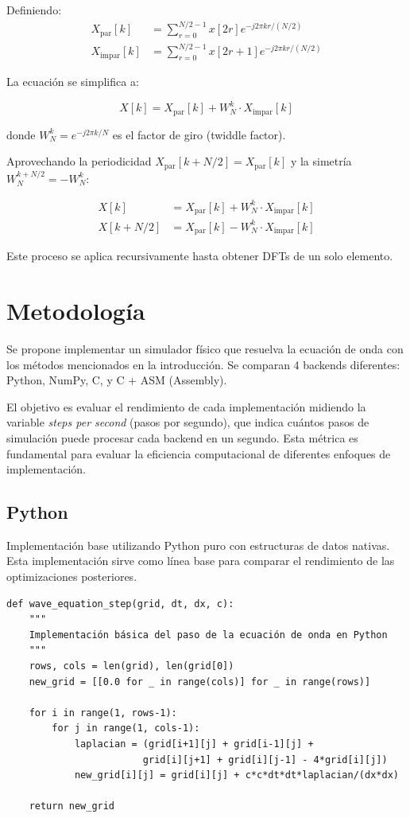 \documentclass[a4paper]{article}
\begin{document}
Definiendo:
\begin{align}
X_{\text{par}}[k] &= \sum_{r=0}^{N/2-1} x[2r] e^{-j2\pi kr/(N/2)} \\
X_{\text{impar}}[k] &= \sum_{r=0}^{N/2-1} x[2r+1] e^{-j2\pi kr/(N/2)}
\end{align}

La ecuación se simplifica a:

\begin{equation}
X[k] = X_{\text{par}}[k] + W_N^k \cdot X_{\text{impar}}[k]
\end{equation}

donde $W_N^k = e^{-j2\pi k/N}$ es el factor de giro (twiddle factor).

Aprovechando la periodicidad $X_{\text{par}}[k + N/2] = X_{\text{par}}[k]$ y la simetría $W_N^{k+N/2} = -W_N^k$:

\begin{align}
X[k] &= X_{\text{par}}[k] + W_N^k \cdot X_{\text{impar}}[k] \\
X[k + N/2] &= X_{\text{par}}[k] - W_N^k \cdot X_{\text{impar}}[k]
\end{align}

Este proceso se aplica recursivamente hasta obtener DFTs de un solo elemento.

\section{Metodología}

Se propone implementar un simulador físico que resuelva la ecuación de onda con los métodos mencionados en la introducción. Se comparan 4 backends diferentes: Python, NumPy, C, y C + ASM (Assembly).

El objetivo es evaluar el rendimiento de cada implementación midiendo la variable \textit{steps per second} (pasos por segundo), que indica cuántos pasos de simulación puede procesar cada backend en un segundo. Esta métrica es fundamental para evaluar la eficiencia computacional de diferentes enfoques de implementación.

\subsection{Python}

Implementación base utilizando Python puro con estructuras de datos nativas. Esta implementación sirve como línea base para comparar el rendimiento de las optimizaciones posteriores.

\begin{verbatim}
def wave_equation_step(grid, dt, dx, c):
    """
    Implementación básica del paso de la ecuación de onda en Python
    """
    rows, cols = len(grid), len(grid[0])
    new_grid = [[0.0 for _ in range(cols)] for _ in range(rows)]
    
    for i in range(1, rows-1):
        for j in range(1, cols-1):
            laplacian = (grid[i+1][j] + grid[i-1][j] + 
                        grid[i][j+1] + grid[i][j-1] - 4*grid[i][j])
            new_grid[i][j] = grid[i][j] + c*c*dt*dt*laplacian/(dx*dx)
    
    return new_grid
\end{verbatim}
\end{document}
